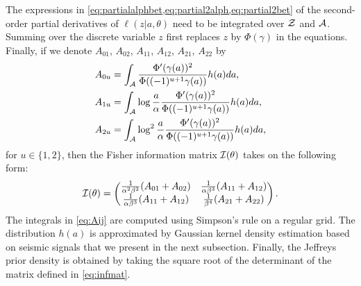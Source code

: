     
The expressions in \cref{eq:partialalphbet,eq:partial2alph,eq:partial2bet} of the second-order partial derivatives of $\ell(z|a,\theta)$ need to be integrated over $\mathcal{Z}$ and $\mathcal{A}$. Summing over the discrete variable $z$ first replaces $z$ by $\Phi(\gamma)$ in the equations.
Finally, if we denote $A_{01}$, $A_{02}$, $A_{11}$, $A_{12}$, $A_{21}$, $A_{22}$ by
    \begin{equation}\label{eq:Aij}
    \begin{aligned}
        A_{0u} &= \int_{\mathcal{A}}\frac{\Phi'(\gamma(a))^2}{\Phi((-1)^{u+1}\gamma(a))}h(a)da,\\
        A_{1u} &= \int_{\mathcal{A}}\log\frac{a}{\alpha}\frac{\Phi'(\gamma(a))^2}{\Phi((-1)^{u+1}\gamma(a))}h(a)da,\\
        A_{2u} &= \int_{\mathcal{A}}\log^2\frac{a}{\alpha}\frac{\Phi'(\gamma(a))^2}{\Phi((-1)^{u+1}\gamma(a))}h(a)da,
    \end{aligned}
    \end{equation}
for $u\in\{1,2\}$,
then the Fisher information matrix $\mathcal{I}(\theta)$ takes on the following form:
    \begin{equation}
    \label{eq:infmat}
        \mathcal{I}(\theta)=\begin{pmatrix}
        \frac{1}{\alpha^2\beta^2}(A_{01} + A_{02}) & \frac{1}{\alpha\beta^3}(A_{11}+A_{12}) \\
        \frac{1}{\alpha\beta^3}(A_{11}+A_{12}) & \frac{1}{\beta^4}(A_{21}+A_{22})
    \end{pmatrix}.
    \end{equation}
The integrals in \cref{eq:Aij} are computed using Simpson's rule on a regular grid. The distribution $h(a)$ is approximated by Gaussian kernel density estimation based on seismic signals that we present in the next subsection.
Finally, the Jeffreys prior density is obtained by taking the square root of the determinant of the matrix defined in \cref{eq:infmat}.




